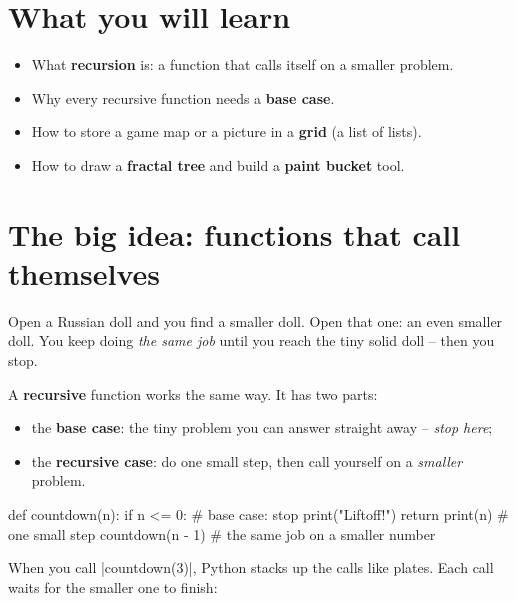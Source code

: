 
\section{What you will learn}
\begin{itemize}[itemsep=1pt]
  \item What \textbf{recursion} is: a function that calls itself on a smaller problem.
  \item Why every recursive function needs a \textbf{base case}.
  \item How to store a game map or a picture in a \textbf{grid} (a list of lists).
  \item How to draw a \textbf{fractal tree} and build a \textbf{paint bucket} tool.
\end{itemize}

\section{The big idea: functions that call themselves}
Open a Russian doll and you find a smaller doll. Open that one: an even smaller doll. You keep doing \emph{the same job} until you reach the tiny solid doll -- then you stop.

A \textbf{recursive} function works the same way. It has two parts:
\begin{itemize}[itemsep=1pt]
  \item the \textbf{base case}: the tiny problem you can answer straight away -- \emph{stop here};
  \item the \textbf{recursive case}: do one small step, then call yourself on a \emph{smaller} problem.
\end{itemize}

\begin{pycode}
def countdown(n):
    if n <= 0:            # base case: stop
        print("Liftoff!")
        return
    print(n)              # one small step
    countdown(n - 1)      # the same job on a smaller number
\end{pycode}

When you call \py|countdown(3)|, Python stacks up the calls like plates. Each call waits for the smaller one to finish:


